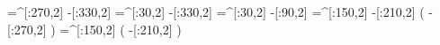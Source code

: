     =^[:270,2]%
     -[:330,2]%
     =^[:30,2]%
     -[:330,2]%
     =^[:30,2]%
      -[:90,2]%
    =^[:150,2]%
     -[:210,2]%
                 (
         -[:270,2]%
                 )
    =^[:150,2]%
                 (
         -[:210,2]%
                 )